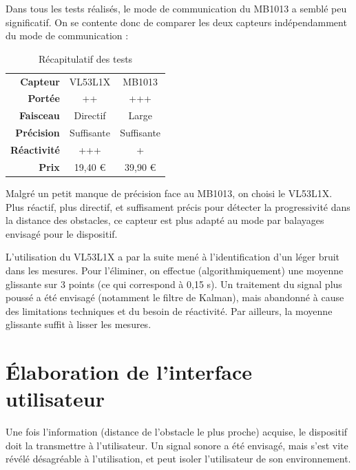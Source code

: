 \documentclass[a4paper, 11pt]{article}
\begin{document}
\par Dans tous les tests réalisés, le mode de communication du MB1013 a semblé peu significatif. On se contente donc de comparer les deux capteurs indépendamment du mode de communication :

\begin{table}[h!]
\centering
\begin{tabular}{r|cc}
{\bf Capteur} & VL53L1X & MB1013 \\
{\bf Portée} & ++ & +++ \\ 
{\bf Faisceau} & Directif & Large \\
{\bf Précision} & Suffisante & Suffisante \\
{\bf Réactivité} & +++ & + \\
{\bf Prix} & 19,40 € & 39,90 € \\
\end{tabular}
\caption{Récapitulatif des tests}
\end{table}

\par Malgré un petit manque de précision face au MB1013, on choisi le VL53L1X. Plus réactif, plus directif, et suffisament précis pour détecter la progressivité dans la distance des obstacles, ce capteur est plus adapté au mode par balayages envisagé pour le dispositif.

\par L'utilisation du VL53L1X a par la suite mené à l'identification d'un léger bruit dans les mesures. Pour l'éliminer, on effectue (algorithmiquement) une moyenne glissante sur 3 points (ce qui correspond à 0,15 s). Un traitement du signal plus poussé a été envisagé (notamment le filtre de Kalman), mais abandonné à cause des limitations techniques et du besoin de réactivité. Par ailleurs, la moyenne glissante suffit à lisser les mesures.




\newpage \section{Élaboration de l'interface utilisateur}

\par Une fois l'information (distance de l'obstacle le plus proche) acquise, le dispositif doit la transmettre à l'utilisateur. Un signal sonore a été envisagé, mais s'est vite révélé désagréable à l'utilisation, et peut isoler l'utilisateur de son environnement.
\end{document}
